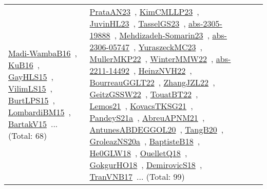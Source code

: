{\begin{longtable}{lp{3cm}>{\raggedright\arraybackslash}p{6cm}>{\raggedright\arraybackslash}p{6cm}>{\raggedright\arraybackslash}p{8cm}}
\href{works/Madi-WambaB16.pdf}{Madi-WambaB16}~\cite{Madi-WambaB16}, \href{works/KuB16.pdf}{KuB16}~\cite{KuB16}, \href{works/GayHLS15.pdf}{GayHLS15}~\cite{GayHLS15}, \href{works/VilimLS15.pdf}{VilimLS15}~\cite{VilimLS15}, \href{works/BurtLPS15.pdf}{BurtLPS15}~\cite{BurtLPS15}, \href{works/LombardiBM15.pdf}{LombardiBM15}~\cite{LombardiBM15}, \href{works/BartakV15.pdf}{BartakV15}~\cite{BartakV15}... (Total: 68) & \href{works/PrataAN23.pdf}{PrataAN23}~\cite{PrataAN23}, \href{works/KimCMLLP23.pdf}{KimCMLLP23}~\cite{KimCMLLP23}, \href{works/JuvinHL23.pdf}{JuvinHL23}~\cite{JuvinHL23}, \href{works/TasselGS23.pdf}{TasselGS23}~\cite{TasselGS23}, \href{works/abs-2305-19888.pdf}{abs-2305-19888}~\cite{abs-2305-19888}, \href{works/Mehdizadeh-Somarin23.pdf}{Mehdizadeh-Somarin23}~\cite{Mehdizadeh-Somarin23}, \href{works/abs-2306-05747.pdf}{abs-2306-05747}~\cite{abs-2306-05747}, \href{works/YuraszeckMC23.pdf}{YuraszeckMC23}~\cite{YuraszeckMC23}, \href{works/MullerMKP22.pdf}{MullerMKP22}~\cite{MullerMKP22}, \href{works/WinterMMW22.pdf}{WinterMMW22}~\cite{WinterMMW22}, \href{works/abs-2211-14492.pdf}{abs-2211-14492}~\cite{abs-2211-14492}, \href{works/HeinzNVH22.pdf}{HeinzNVH22}~\cite{HeinzNVH22}, \href{works/BourreauGGLT22.pdf}{BourreauGGLT22}~\cite{BourreauGGLT22}, \href{works/ZhangJZL22.pdf}{ZhangJZL22}~\cite{ZhangJZL22}, \href{works/GeitzGSSW22.pdf}{GeitzGSSW22}~\cite{GeitzGSSW22}, \href{works/TouatBT22.pdf}{TouatBT22}~\cite{TouatBT22}, \href{works/Lemos21.pdf}{Lemos21}~\cite{Lemos21}, \href{works/KovacsTKSG21.pdf}{KovacsTKSG21}~\cite{KovacsTKSG21}, \href{works/PandeyS21a.pdf}{PandeyS21a}~\cite{PandeyS21a}, \href{works/AbreuAPNM21.pdf}{AbreuAPNM21}~\cite{AbreuAPNM21}, \href{works/AntunesABDEGGOL20.pdf}{AntunesABDEGGOL20}~\cite{AntunesABDEGGOL20}, \href{works/TangB20.pdf}{TangB20}~\cite{TangB20}, \href{works/GroleazNS20a.pdf}{GroleazNS20a}~\cite{GroleazNS20a}, \href{works/BaptisteB18.pdf}{BaptisteB18}~\cite{BaptisteB18}, \href{works/He0GLW18.pdf}{He0GLW18}~\cite{He0GLW18}, \href{works/OuelletQ18.pdf}{OuelletQ18}~\cite{OuelletQ18}, \href{works/GokgurHO18.pdf}{GokgurHO18}~\cite{GokgurHO18}, \href{works/DemirovicS18.pdf}{DemirovicS18}~\cite{DemirovicS18}, \href{works/TranVNB17.pdf}{TranVNB17}~\cite{TranVNB17}... (Total: 99)\\

\end{longtable}}
